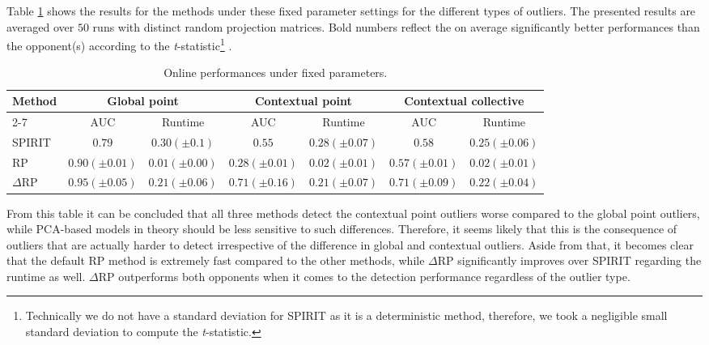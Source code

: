 Table \ref{tab:analysis_results} shows the results for the methods under these fixed parameter settings for the different types of outliers. The presented results are averaged over $50$ runs with distinct random projection matrices. Bold numbers reflect the on average significantly better performances than the opponent(s) according to the \textit{t}-statistic\footnote{Technically we do not have a standard deviation for SPIRIT as it is a deterministic method, therefore, we took a negligible small standard deviation to compute the \textit{t}-statistic.} \cite{student1908probable}. 

\begin{table}[h]
	\vspace{0.15cm}
	\centering
	\caption{Online performances under fixed parameters.}
	\label{tab:analysis_results}
	\small
	\hspace*{-0.25cm}
	\begin{tabular}{l c c c c c c}
		\toprule	
		\multirow{3}{*}{\textbf{Method}}				&  \multicolumn{2}{c}{\textbf{Global point}}	& \multicolumn{2}{c}{\textbf{Contextual point}} & \multicolumn{2}{c}{\textbf{Contextual collective}}\\	
		\cmidrule{2-7}
						& 	AUC 	& Runtime 	& AUC 	& Runtime 	& AUC 	& Runtime 	\\
		\midrule
		SPIRIT	& $0.79	 $	&$	0.30 (\pm 0.1)	$&$	0.55 $	& $	0.28 (\pm 0.07)$	& 	$	0.58$	& $0.25	(\pm 0.06)$ \\
		
		RP  	& $0.90	(\pm 0.01)$	& $\mathbf{0.01 (\pm 0.00)}$ & $0.28 (\pm 0.01)$	& $\mathbf{0.02 (\pm 0.01)}$	& 	$	0.57 (\pm 0.01)$	& $\mathbf{0.02	(\pm 0.01)}$ \\

		$\Delta$RP		& $\mathbf{0.95 (\pm 0.05)}$	&	$0.21 (\pm 0.06)$	&	$\mathbf{0.71 (\pm 0.16)}$	& 	$0.21 (\pm 0.07)$	&	$\mathbf{0.71 (\pm 0.09)}$		&  $0.22 (\pm 0.04)$	\\
		\bottomrule
	\end{tabular}
\end{table}

From this table it can be concluded that all three methods detect the contextual point outliers worse compared to the global point outliers, while PCA-based models in theory should be less sensitive to such differences. Therefore, it seems likely that this is the consequence of outliers that are actually harder to detect irrespective of the difference in global and contextual outliers. Aside from that, it becomes clear that the default RP method is extremely fast compared to the other methods, while $\Delta$RP significantly improves over SPIRIT regarding the runtime as well. $\Delta$RP outperforms both opponents when it comes to the detection performance regardless of the outlier type.

